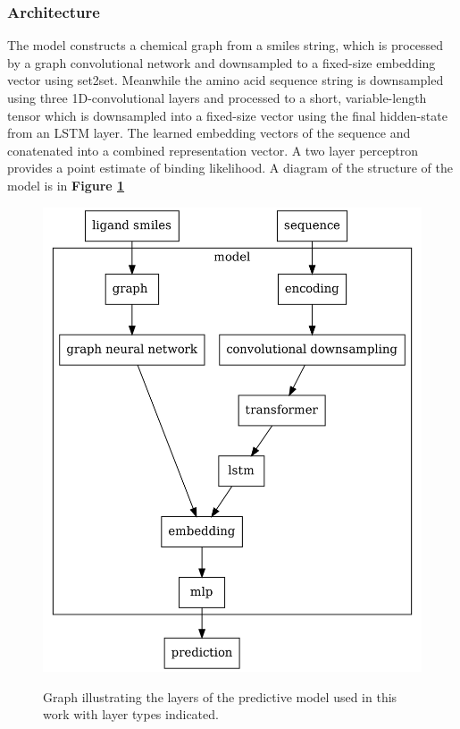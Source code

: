 \documentclass{article}
\begin{document}
\subsubsection{Architecture}
The model constructs a chemical graph from a smiles string, which is processed by a graph convolutional network and downsampled to a fixed-size embedding vector using set2set. Meanwhile the amino acid sequence string is downsampled using three 1D-convolutional layers and processed to a short, variable-length tensor which is downsampled into a fixed-size vector using the final hidden-state from an LSTM layer. %
The learned embedding vectors of the sequence and conatenated into a combined representation vector. A two layer perceptron provides a point estimate of binding likelihood. A diagram of the structure of the model is in \textbf{Figure \ref{rio}} %
\par
\begin{figure}
	\caption{Graph illustrating the layers of the predictive model used in this work with layer types indicated.\label{rio}}
		\includegraphics[width = \textwidth]{rio.png} \\
\end{figure}
\par
\par
\end{document}
